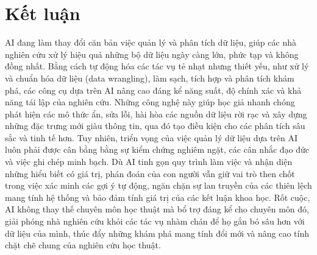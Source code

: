 \section{Kết luận}

AI đang làm thay đổi căn bản việc quản lý và phân tích dữ liệu, giúp các nhà nghiên cứu xử lý hiệu quả những bộ dữ liệu ngày càng lớn, phức tạp và không đồng nhất. Bằng cách tự động hóa các tác vụ tẻ nhạt nhưng thiết yếu, như xử lý và chuẩn hóa dữ liệu (data wrangling), làm sạch, tích hợp và phân tích khám phá, các công cụ dựa trên AI nâng cao đáng kể năng suất, độ chính xác và khả năng tái lập của nghiên cứu. Những công nghệ này giúp học giả nhanh chóng phát hiện các mô thức ẩn, sửa lỗi, hài hòa các nguồn dữ liệu rời rạc và xây dựng những đặc trưng mới giàu thông tin, qua đó tạo điều kiện cho các phân tích sâu sắc và tinh tế hơn. Tuy nhiên, triển vọng của việc quản lý dữ liệu dựa trên AI luôn phải được cân bằng bằng sự kiểm chứng nghiêm ngặt, các cân nhắc đạo đức và việc ghi chép minh bạch. Dù AI tinh gọn quy trình làm việc và nhận diện những hiểu biết có giá trị, phán đoán của con người vẫn giữ vai trò then chốt trong việc xác minh các gợi ý tự động, ngăn chặn sự lan truyền của các thiên lệch mang tính hệ thống và bảo đảm tính giá trị của các kết luận khoa học. Rốt cuộc, AI không thay thế chuyên môn học thuật mà bổ trợ đáng kể cho chuyên môn đó, giải phóng nhà nghiên cứu khỏi các tác vụ nhàm chán để họ gắn bó sâu hơn với dữ liệu của mình, thúc đẩy những khám phá mang tính đổi mới và nâng cao tính chặt chẽ chung của nghiên cứu học thuật.
